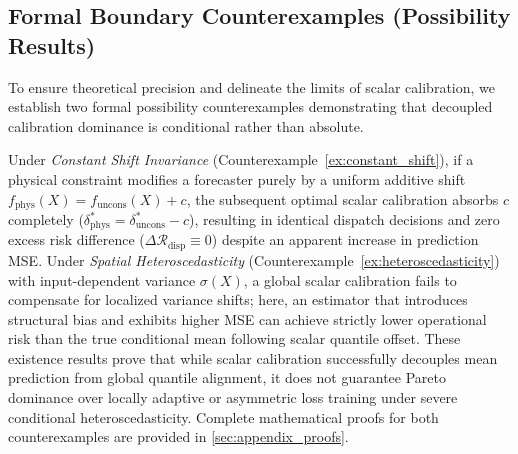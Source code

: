 \subsection{Formal Boundary Counterexamples (Possibility Results)}
To ensure theoretical precision and delineate the limits of scalar calibration, we establish two formal possibility counterexamples demonstrating that decoupled calibration dominance is conditional rather than absolute.

Under \textit{Constant Shift Invariance} (Counterexample~\ref{ex:constant_shift}), if a physical constraint modifies a forecaster purely by a uniform additive shift $f_{\text{phys}}(X) = f_{\text{uncons}}(X) + c$, the subsequent optimal scalar calibration absorbs $c$ completely ($\delta_{\text{phys}}^* = \delta_{\text{uncons}}^* - c$), resulting in identical dispatch decisions and zero excess risk difference ($\Delta \mathcal{R}_{\text{disp}} \equiv 0$) despite an apparent increase in prediction MSE. Under \textit{Spatial Heteroscedasticity} (Counterexample~\ref{ex:heteroscedasticity}) with input-dependent variance $\sigma(X)$, a global scalar calibration fails to compensate for localized variance shifts; here, an estimator that introduces structural bias and exhibits higher MSE can achieve strictly lower operational risk than the true conditional mean following scalar quantile offset. These existence results prove that while scalar calibration successfully decouples mean prediction from global quantile alignment, it does not guarantee Pareto dominance over locally adaptive or asymmetric loss training under severe conditional heteroscedasticity. Complete mathematical proofs for both counterexamples are provided in \ref{sec:appendix_proofs}.

